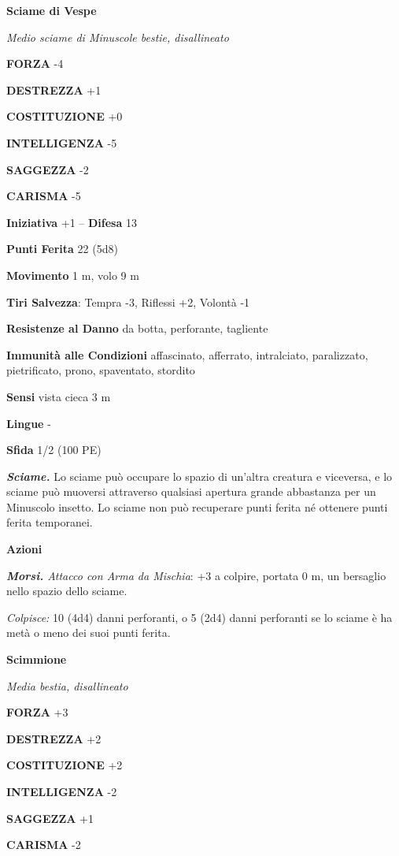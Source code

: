 \begin{multicols}{2}
\medskip\textbf{Sciame di Vespe}

\emph{Medio sciame di Minuscole bestie, disallineato}

\textbf{FORZA} -4

\textbf{DESTREZZA} +1

\textbf{COSTITUZIONE} +0

\textbf{INTELLIGENZA} -5

\textbf{SAGGEZZA} -2

\textbf{CARISMA} -5

\textbf{Iniziativa} +1 -- \textbf{Difesa} 13

\textbf{Punti Ferita} 22 (5d8)

\textbf{Movimento} 1 m, volo 9 m

\textbf{Tiri Salvezza}: Tempra -3, Riflessi +2, Volontà -1

\textbf{Resistenze al Danno} da botta, perforante, tagliente

\textbf{Immunità alle Condizioni} affascinato, afferrato, intralciato, paralizzato, pietrificato, prono, spaventato, stordito

\textbf{Sensi} vista cieca 3 m

\textbf{Lingue} -

\textbf{Sfida} 1/2 (100 PE)

\emph{\textbf{Sciame.}} Lo sciame può occupare lo spazio di un'altra creatura e viceversa, e lo sciame può muoversi attraverso qualsiasi apertura grande abbastanza per un Minuscolo insetto. Lo sciame non può recuperare punti ferita né ottenere punti ferita temporanei.

\textbf{Azioni}

\emph{\textbf{Morsi.} Attacco con Arma da Mischia}: +3 a colpire, portata 0 m, un bersaglio nello spazio dello sciame.

\emph{Colpisce:} 10 (4d4) danni perforanti, o 5 (2d4) danni perforanti se lo sciame è ha metà o meno dei suoi punti ferita.

\medskip\textbf{Scimmione}

\emph{Media bestia, disallineato}

\textbf{FORZA} +3

\textbf{DESTREZZA} +2

\textbf{COSTITUZIONE} +2

\textbf{INTELLIGENZA} -2

\textbf{SAGGEZZA} +1

\textbf{CARISMA} -2


\end{multicols}
